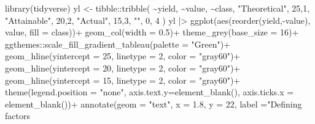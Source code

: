 \documentclass[
  letterpaper,
]{book}
\newenvironment{Shaded}{\begin{snugshade}}{\end{snugshade}}
\newcommand{\AttributeTok}[1]{\textcolor[rgb]{0.40,0.45,0.13}{#1}}
\newcommand{\DecValTok}[1]{\textcolor[rgb]{0.68,0.00,0.00}{#1}}
\newcommand{\FloatTok}[1]{\textcolor[rgb]{0.68,0.00,0.00}{#1}}
\newcommand{\FunctionTok}[1]{\textcolor[rgb]{0.28,0.35,0.67}{#1}}
\newcommand{\NormalTok}[1]{\textcolor[rgb]{0.00,0.23,0.31}{#1}}
\newcommand{\OtherTok}[1]{\textcolor[rgb]{0.00,0.23,0.31}{#1}}
\newcommand{\SpecialCharTok}[1]{\textcolor[rgb]{0.37,0.37,0.37}{#1}}
\newcommand{\StringTok}[1]{\textcolor[rgb]{0.13,0.47,0.30}{#1}}
\begin{document}
\begin{Shaded}
\begin{Highlighting}[]
\FunctionTok{library}\NormalTok{(tidyverse)}
\NormalTok{yl }\OtherTok{\textless{}{-}}\NormalTok{ tibble}\SpecialCharTok{::}\FunctionTok{tribble}\NormalTok{(}
  \SpecialCharTok{\textasciitilde{}}\NormalTok{yield, }\SpecialCharTok{\textasciitilde{}}\NormalTok{value, }\SpecialCharTok{\textasciitilde{}}\NormalTok{class,}
  \StringTok{"Theoretical"}\NormalTok{, }\DecValTok{25}\NormalTok{,}\DecValTok{1}\NormalTok{,}
  \StringTok{"Attainable"}\NormalTok{, }\DecValTok{20}\NormalTok{,}\DecValTok{2}\NormalTok{,}
  \StringTok{"Actual"}\NormalTok{, }\DecValTok{15}\NormalTok{,}\DecValTok{3}\NormalTok{,}
  \StringTok{""}\NormalTok{, }\DecValTok{0}\NormalTok{, }\DecValTok{4}
\NormalTok{)}
\NormalTok{yl }\SpecialCharTok{|\textgreater{}} 
  \FunctionTok{ggplot}\NormalTok{(}\FunctionTok{aes}\NormalTok{(}\FunctionTok{reorder}\NormalTok{(yield,}\SpecialCharTok{{-}}\NormalTok{value), value, }\AttributeTok{fill =}\NormalTok{ class))}\SpecialCharTok{+}
  \FunctionTok{geom\_col}\NormalTok{(}\AttributeTok{width =} \FloatTok{0.5}\NormalTok{)}\SpecialCharTok{+}
  \FunctionTok{theme\_grey}\NormalTok{(}\AttributeTok{base\_size =} \DecValTok{16}\NormalTok{)}\SpecialCharTok{+}
\NormalTok{  ggthemes}\SpecialCharTok{::}\FunctionTok{scale\_fill\_gradient\_tableau}\NormalTok{(}\AttributeTok{palette =} \StringTok{"Green"}\NormalTok{)}\SpecialCharTok{+}
  \FunctionTok{geom\_hline}\NormalTok{(}\AttributeTok{yintercept =} \DecValTok{25}\NormalTok{, }\AttributeTok{linetype =} \DecValTok{2}\NormalTok{, }\AttributeTok{color =} \StringTok{"gray60"}\NormalTok{)}\SpecialCharTok{+}
  \FunctionTok{geom\_hline}\NormalTok{(}\AttributeTok{yintercept =} \DecValTok{20}\NormalTok{, }\AttributeTok{linetype =} \DecValTok{2}\NormalTok{, }\AttributeTok{color =} \StringTok{"gray60"}\NormalTok{)}\SpecialCharTok{+}
  \FunctionTok{geom\_hline}\NormalTok{(}\AttributeTok{yintercept =} \DecValTok{15}\NormalTok{, }\AttributeTok{linetype =} \DecValTok{2}\NormalTok{, }\AttributeTok{color =} \StringTok{"gray60"}\NormalTok{)}\SpecialCharTok{+}
  \FunctionTok{theme}\NormalTok{(}\AttributeTok{legend.position =} \StringTok{"none"}\NormalTok{, }
        \AttributeTok{axis.text.y=}\FunctionTok{element\_blank}\NormalTok{(),}
        \AttributeTok{axis.ticks.x =} \FunctionTok{element\_blank}\NormalTok{())}\SpecialCharTok{+}
  \FunctionTok{annotate}\NormalTok{(}\AttributeTok{geom =} \StringTok{"text"}\NormalTok{, }\AttributeTok{x =} \FloatTok{1.8}\NormalTok{, }\AttributeTok{y =} \DecValTok{22}\NormalTok{, }\AttributeTok{label =}\StringTok{"Defining factors }

\end{Highlighting}
\end{Shaded}
\end{document}
